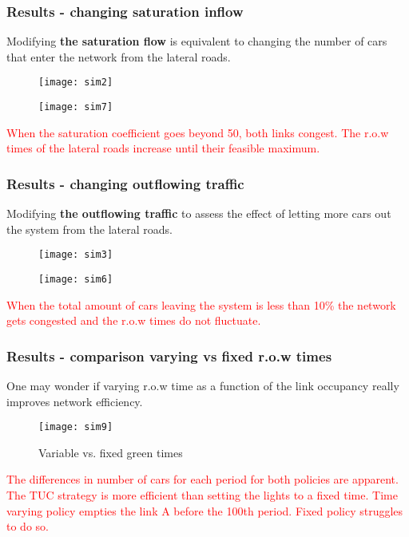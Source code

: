 \documentclass{beamer}
\begin{document}
\begin{frame}
\frametitle{Results - changing saturation inflow}
\small
Modifying \textbf{the saturation flow} is equivalent to changing the number of cars that enter the network from the lateral roads.

\begin{figure}[h!]
          \centering
	\texttt{[image: sim2]}
\end{figure}
\begin{figure}[h!]
          \centering
{}
	\texttt{[image: sim7]}
\end{figure}
\textcolor{red}{When the saturation coefficient goes beyond 50, both links congest. The r.o.w times of the lateral roads increase until their feasible maximum.}

\end{frame}

\begin{frame}
\frametitle{Results - changing outflowing traffic}
\small
Modifying \textbf{the outflowing traffic} to assess the effect of letting more cars out the system from the lateral roads.

\begin{figure}[h!]
          \centering
	\texttt{[image: sim3]}
\end{figure}
\begin{figure}[h!]
          \centering
{}
	\texttt{[image: sim6]}
\end{figure}
\textcolor{red}{When the total amount of cars leaving the system is less than 10\% the network gets congested and the r.o.w times do not fluctuate.}

\end{frame}


\begin{frame}
\frametitle{Results - comparison varying vs fixed r.o.w times}
\small
One may wonder if varying r.o.w time as a function of the link occupancy really improves network efficiency.

\begin{figure}[h!]
     \caption{Variable vs. fixed green times}
      \centering
	\texttt{[image: sim9]}
\end{figure}


\textcolor{red}{The differences in number of cars for each period for both policies are apparent. The TUC strategy is more efficient than setting the lights to a fixed time. Time varying policy empties the link A before the 100th period. Fixed policy struggles to do so.}

\end{frame}
\end{document}
